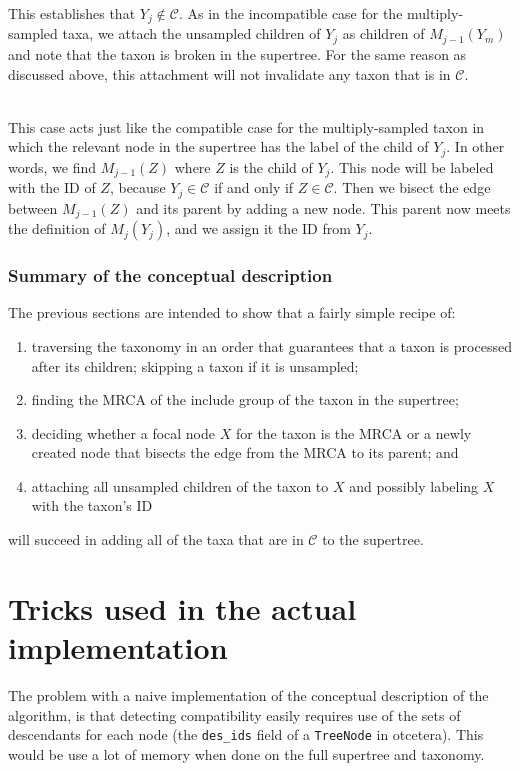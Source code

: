 \documentclass[english]{article}
\begin{document}
This establishes that $Y_j\notin\mathcal{C}$.
As in the incompatible case for the multiply-sampled taxa, we attach
    the unsampled children of $Y_j$ as children of $M_{j-1}(Y_m)$ and note that 
    the taxon is broken in the supertree.
For the same reason as discussed above, this attachment will not invalidate
    any taxon that is in $\mathcal{C}$.

\\
This case acts just like the compatible case for the multiply-sampled taxon in which
    the relevant node in the supertree has the label of the child of $Y_j$.
In other words, we find $M_{j-1}(Z)$ where $Z$ is the child of $Y_j$.
This node will be labeled with the ID of $Z$, because $Y_j\in\mathcal{C}$ if and
    only if $Z\in\mathcal{C}$.
Then we bisect the edge between $M_{j-1}(Z)$ and its parent by adding a new node. 
This parent now meets the definition of $M_{j}(Y_j)$, and we assign it the ID from
    $Y_j$.

\subsubsection{Summary of the conceptual description}
The previous sections are intended to show that a fairly simple recipe of:
\begin{enumerate} 
    \item traversing the taxonomy in an order that guarantees that a taxon 
        is processed after its children;
    \itme skipping a taxon if it is unsampled;
    \item finding the MRCA of the include group of the taxon in the supertree;
    \item deciding whether a focal node $X$ for the taxon is the MRCA or a newly
        created node that bisects the edge from the MRCA to its parent; and
    \item attaching all unsampled children of the taxon to $X$ and possibly
        labeling $X$ with the taxon's ID
\end{enumerate}
will succeed in adding all of the taxa that are in $\mathcal{C}$ to the supertree.

\section{Tricks used in the actual implementation}
The problem with a naive implementation of the conceptual description of the 
    algorithm, is that detecting compatibility easily requires use of
    the sets of descendants for each node (the \texttt{des\_ids} field of
    a \texttt{TreeNode} in otcetera).
This would be use a lot of memory when done on the full supertree and taxonomy.
\end{document}
